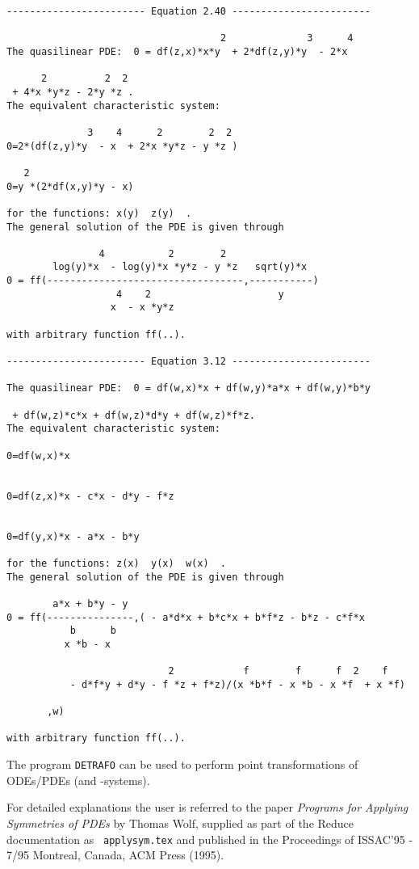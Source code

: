 \documentclass[11pt,letterpaper]{book}
\makeatletter
\newcommand{\underscore}{\_}
\newcommand{\ttindex}[1]{{\renewcommand{\_}{\protect\underscore}%
                          \index{#1@{\tt #1}}}}
\makeatother
\begin{document}
{\small
{\small\begin{verbatim}
------------------------ Equation 2.40 ------------------------

                                     2              3      4
The quasilinear PDE:  0 = df(z,x)*x*y  + 2*df(z,y)*y  - 2*x

      2          2  2
 + 4*x *y*z - 2*y *z .
The equivalent characteristic system:

              3    4      2        2  2
0=2*(df(z,y)*y  - x  + 2*x *y*z - y *z )

   2
0=y *(2*df(x,y)*y - x)

for the functions: x(y)  z(y)  .
The general solution of the PDE is given through

                4           2        2
        log(y)*x  - log(y)*x *y*z - y *z   sqrt(y)*x
0 = ff(----------------------------------,-----------)
                   4    2                      y
                  x  - x *y*z

with arbitrary function ff(..).

------------------------ Equation 3.12 ------------------------

The quasilinear PDE:  0 = df(w,x)*x + df(w,y)*a*x + df(w,y)*b*y

 + df(w,z)*c*x + df(w,z)*d*y + df(w,z)*f*z.
The equivalent characteristic system:

0=df(w,x)*x


0=df(z,x)*x - c*x - d*y - f*z


0=df(y,x)*x - a*x - b*y

for the functions: z(x)  y(x)  w(x)  .
The general solution of the PDE is given through

        a*x + b*y - y
0 = ff(---------------,( - a*d*x + b*c*x + b*f*z - b*z - c*f*x
           b      b
          x *b - x

                            2            f        f      f  2    f
           - d*f*y + d*y - f *z + f*z)/(x *b*f - x *b - x *f  + x *f)

       ,w)

with arbitrary function ff(..).
\end{verbatim}}
}
The program {\tt DETRAFO}\ttindex{DETRAFO} can be used to perform
point transformations of ODEs/PDEs (and -systems).

For detailed explanations the user is
referred to the paper {\em Programs for Applying Symmetries of PDEs}
by Thomas Wolf, supplied as part of the Reduce documentation as {\tt
applysym.tex} and published in the Proceedings of ISSAC'95 - 7/95
Montreal, Canada, ACM Press (1995).
\end{document}
